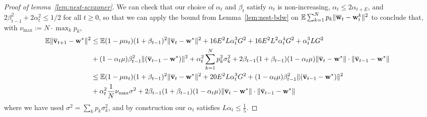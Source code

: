 \begin{proof}[Proof of lemma~\ref{lem:nest-scvxoner}]
We can check that our choice of $\alpha_t$ and $\beta_t$ satisfy $\alpha_t$ is non-increasing, $\alpha_t \leq 2\alpha_{t+E}$, and $2\beta_{t-1}^{2}+2\alpha_{t}^{2}\leq1/2$ for all $t\geq 0$, so that we can apply the bound from Lemma~\ref{lem:nest-bdw} on $\mathbb{E}\sum_{k=1}^{N}p_{k}\|{\overline{\mathbf{w}}}_{t}-{\mathbf{w}}_{t}^{k}\|^{2}$ to conclude that, with $\nu_{\max}:=N\cdot\max_{k}p_{k}$,
\begin{align*}
\mathbb{E}\|{\overline{\mathbf{v}}}_{t+1}-{\mathbf{w}}^{\ast}\|^{2} & \leq\mathbb{E}(1-\mu\alpha_{t})(1+\beta_{t-1})^{2}\|{\overline{\mathbf{v}}}_{t}-{\mathbf{w}}^{\ast}\|^{2}+16E^{2}L\alpha_{t}^{3}G^{2}+16E^{2}L^{2}\alpha_{t}^{4}G^{2}+\alpha_{t}^{3}LG^{2}\\
& +(1-\alpha_{t}\mu)\beta_{t-1}^{2}\|({\overline{\mathbf{v}}}_{t-1}-{\mathbf{w}}^{\ast})\|^{2} +\alpha_{t}^{2}\sum_{k=1}^{N}p_{k}^{2}\sigma_{k}^{2}+2\beta_{t-1}(1+\beta_{t-1})(1-\alpha_{t}\mu)\|{\overline{\mathbf{v}}}_{t}-{\mathbf{w}}^{\ast}\|\cdot\|{\overline{\mathbf{v}}}_{t-1}-{\mathbf{w}}^{\ast}\|\\
& \leq\mathbb{E}(1-\mu\alpha_{t})(1+\beta_{t-1})^{2}\|{\overline{\mathbf{v}}}_{t}-{\mathbf{w}}^{\ast}\|^{2}+20E^{2}L\alpha_{t}^{3}G^{2}+(1-\alpha_{t}\mu)\beta_{t-1}^{2}\|({\overline{\mathbf{v}}}_{t-1}-{\mathbf{w}}^{\ast})\|^{2}\\
& +\alpha_{t}^{2}\frac{1}{N}\nu_{\max}\sigma^{2}+2\beta_{t-1}(1+\beta_{t-1})(1-\alpha_{t}\mu)\|{\overline{\mathbf{v}}}_{t}-{\mathbf{w}}^{\ast}\|\cdot\|{\overline{\mathbf{v}}}_{t-1}-{\mathbf{w}}^{\ast}\|
\end{align*}
where we have used $\sigma^{2}=\sum_{k}p_{k}\sigma_{k}^{2}$, and by construction our $\alpha_{t}$
satisfies $L\alpha_{t}\leq\frac{1}{5}$.
\end{proof}